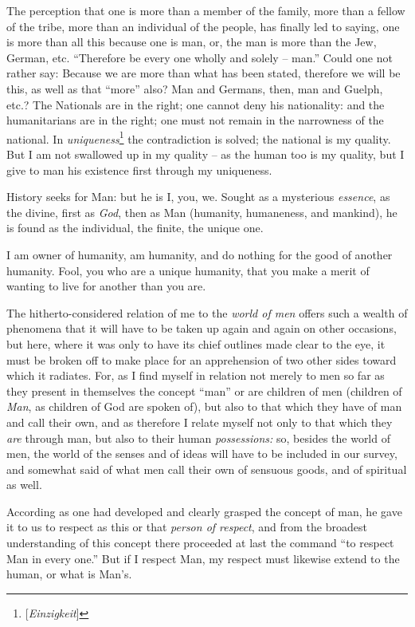 The perception that one is more than a member of the family, more than a 
fellow of the tribe, more than an individual of the people, has finally led to 
saying, one is more than all this because one is man, or, the man is more than 
the Jew, German, etc. ``Therefore be every one wholly and solely -- man.'' 
Could one not rather say: Because we are more than what has been stated, 
therefore we will be this, as well as that ``more'' also? Man and Germans, 
then, man and Guelph, etc.? The Nationals are in the right; one cannot deny 
his nationality: and the humanitarians are in the right; one must not remain 
in the narrowness of the national. In 
\textit{uniqueness}\footnote{[\textit{Einzigkeit}]} the contradiction is 
solved; the national is my quality. But I am not swallowed up in my quality -- 
as the human too is my quality, but I give to man his existence first through 
my uniqueness.

History seeks for Man: but he is I, you, we. Sought as a mysterious 
\textit{essence}, as the divine, first as \textit{God}, then as Man (humanity, 
humaneness, and mankind), he is found as the individual, the finite, the 
unique one.

I am owner of humanity, am humanity, and do nothing for the good of another 
humanity. Fool, you who are a unique humanity, that you make a merit of 
wanting to live for another than you are.

The hitherto-considered relation of me to the \textit{world of men} offers 
such a wealth of phenomena that it will have to be taken up again and again on 
other occasions, but here, where it was only to have its chief outlines made 
clear to the eye, it must be broken off to make place for an apprehension of 
two other sides toward which it radiates. For, as I find myself in relation 
not merely to men so far as they present in themselves the concept ``man'' 
or are children of men (children of \textit{Man}, as children of God are 
spoken of), but also to that which they have of man and call their own, and as 
therefore I relate myself not only to that which they \textit{are} through 
man, but also to their human \textit{possessions:} so, besides the world of 
men, the world of the senses and of ideas will have to be included in our 
survey, and somewhat said of what men call their own of sensuous goods, and of 
spiritual as well.

According as one had developed and clearly grasped the concept of man, he gave 
it to us to respect as this or that \textit{person of respect}, and from the 
broadest understanding of this concept there proceeded at last the command 
``to respect Man in every one.'' But if I respect Man, my respect must 
likewise extend to the human, or what is Man's.

